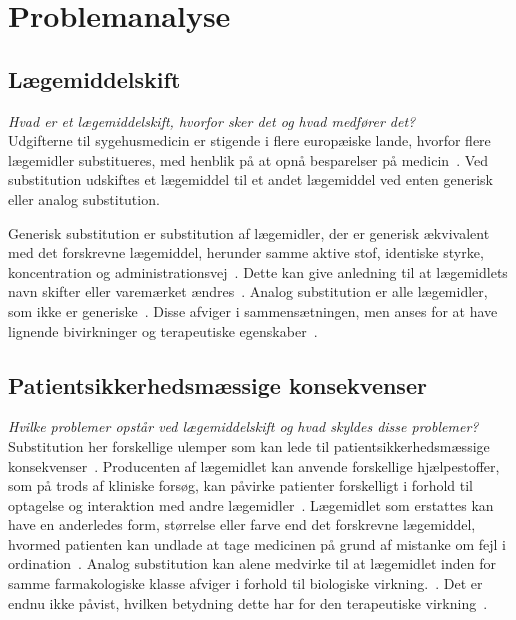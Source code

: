 \chapter{Problemanalyse}

\section{Lægemiddelskift}
\textit{Hvad er et lægemiddelskift, hvorfor sker det og hvad medfører det?} \\
Udgifterne til sygehusmedicin er stigende i flere europæiske lande, hvorfor flere lægemidler substitueres, med henblik på at opnå besparelser på medicin~\citep{Ess2003,Johnston2011}. Ved substitution udskiftes et lægemiddel til et andet lægemiddel ved enten generisk eller analog substitution.

Generisk substitution er substitution af lægemidler, der er  generisk ækvivalent med det forskrevne lægemiddel, herunder samme aktive stof, identiske styrke, koncentration og administrationsvej~\citep{DanskSelskabforPatientsikkerhed2009, Kairi2017}. Dette kan give anledning til at lægemidlets navn skifter eller varemærket ændres~\citep{Kairi2017}. Analog substitution er alle lægemidler, som ikke er generiske~\citep{Kairi2017}. Disse afviger i sammensætningen, men anses for at have lignende bivirkninger og terapeutiske egenskaber~\citep{DanskSelskabforPatientsikkerhed2009, Kairi2017}.


\section{Patientsikkerhedsmæssige konsekvenser} \label{sec:ProblemLaeg} %
\textit{Hvilke problemer opstår ved lægemiddelskift og hvad skyldes disse problemer?} \\
Substitution her forskellige ulemper som kan lede til patientsikkerhedsmæssige konsekvenser~\citep{DanskSelskabforPatientsikkerhed2009}. Producenten af lægemidlet kan anvende forskellige hjælpestoffer, som på trods af kliniske forsøg, kan påvirke patienter forskelligt i forhold til optagelse og interaktion med andre lægemidler~\citep{Kairi2017}. Lægemidlet som erstattes kan have en anderledes form, størrelse eller farve end det forskrevne lægemiddel, hvormed patienten kan undlade at tage medicinen på grund af mistanke om fejl i ordination~\citep{Kairi2017}. Analog substitution kan alene medvirke til at lægemidlet inden for samme farmakologiske klasse afviger i forhold til biologiske virkning.~\citep{Kairi2017}. Det er endnu ikke påvist, hvilken betydning dette har for den terapeutiske virkning~\citep{Kairi2017}. 

